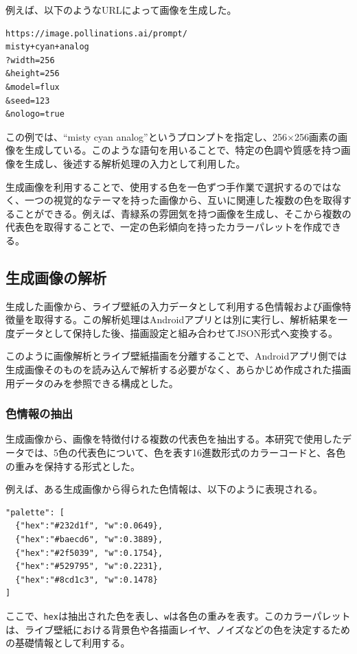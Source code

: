 例えば、以下のようなURLによって画像を生成した。

\begin{verbatim}
https://image.pollinations.ai/prompt/
misty+cyan+analog
?width=256
&height=256
&model=flux
&seed=123
&nologo=true
\end{verbatim}

この例では、``misty cyan analog''というプロンプトを指定し、256×256画素の画像を生成している。このような語句を用いることで、特定の色調や質感を持つ画像を生成し、後述する解析処理の入力として利用した。

生成画像を利用することで、使用する色を一色ずつ手作業で選択するのではなく、一つの視覚的なテーマを持った画像から、互いに関連した複数の色を取得することができる。例えば、青緑系の雰囲気を持つ画像を生成し、そこから複数の代表色を取得することで、一定の色彩傾向を持ったカラーパレットを作成できる。


\subsection{生成画像の解析}

生成した画像から、ライブ壁紙の入力データとして利用する色情報および画像特徴量を取得する。この解析処理はAndroidアプリとは別に実行し、解析結果を一度データとして保持した後、描画設定と組み合わせてJSON形式へ変換する。

このように画像解析とライブ壁紙描画を分離することで、Androidアプリ側では生成画像そのものを読み込んで解析する必要がなく、あらかじめ作成された描画用データのみを参照できる構成とした。


\subsubsection{色情報の抽出}

生成画像から、画像を特徴付ける複数の代表色を抽出する。本研究で使用したデータでは、5色の代表色について、色を表す16進数形式のカラーコードと、各色の重みを保持する形式とした。

例えば、ある生成画像から得られた色情報は、以下のように表現される。

\begin{verbatim}
"palette": [
  {"hex":"#232d1f", "w":0.0649},
  {"hex":"#baecd6", "w":0.3889},
  {"hex":"#2f5039", "w":0.1754},
  {"hex":"#529795", "w":0.2231},
  {"hex":"#8cd1c3", "w":0.1478}
]
\end{verbatim}

ここで、\texttt{hex}は抽出された色を表し、\texttt{w}は各色の重みを表す。このカラーパレットは、ライブ壁紙における背景色や各描画レイヤ、ノイズなどの色を決定するための基礎情報として利用する。

